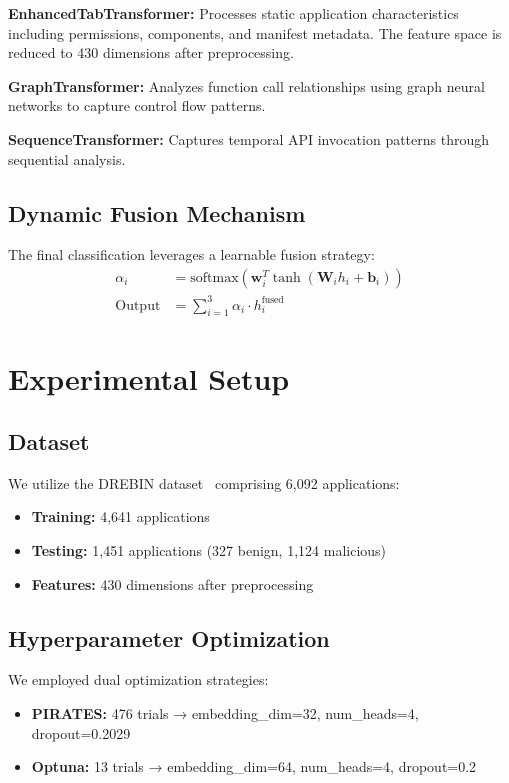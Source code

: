 \documentclass[a4paper,11pt]{article}
\begin{document}
\textbf{EnhancedTabTransformer:} Processes static application characteristics including permissions, components, and manifest metadata. The feature space is reduced to 430 dimensions after preprocessing.

\textbf{GraphTransformer:} Analyzes function call relationships using graph neural networks to capture control flow patterns.

\textbf{SequenceTransformer:} Captures temporal API invocation patterns through sequential analysis.

\subsection{Dynamic Fusion Mechanism}
The final classification leverages a learnable fusion strategy:
\begin{align}
\alpha_i &= \text{softmax}(\mathbf{w}_i^T \tanh(\mathbf{W}_i h_i + \mathbf{b}_i)) \\
\text{Output} &= \sum_{i=1}^{3} \alpha_i \cdot h_i^{\text{fused}}
\end{align}

\section{Experimental Setup}
\subsection{Dataset}
We utilize the DREBIN dataset~\cite{Drebin} comprising 6,092 applications:
\begin{itemize}
  \item \textbf{Training:} 4,641 applications
  \item \textbf{Testing:} 1,451 applications (327 benign, 1,124 malicious)
  \item \textbf{Features:} 430 dimensions after preprocessing
\end{itemize}

\subsection{Hyperparameter Optimization}
We employed dual optimization strategies:
\begin{itemize}
  \item \textbf{PIRATES:} 476 trials → embedding\_dim=32, num\_heads=4, dropout=0.2029
  \item \textbf{Optuna:} 13 trials → embedding\_dim=64, num\_heads=4, dropout=0.2
\end{itemize}
\end{document}
